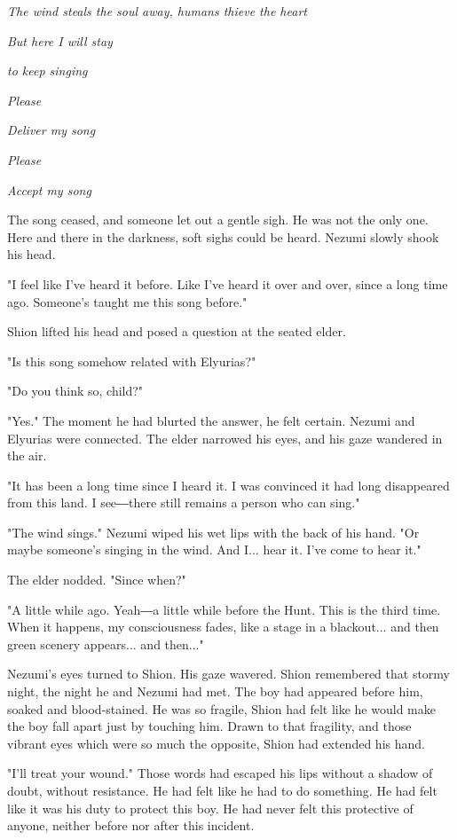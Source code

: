 \emph{The wind steals the soul away, humans thieve the heart}

\emph{But here I will stay}

\emph{to keep singing}

\emph{Please}

\emph{Deliver my song}

\emph{Please}

\emph{Accept my song}

The song ceased, and someone let out a gentle sigh. He was not the only
one. Here and there in the darkness, soft sighs could be heard. Nezumi
slowly shook his head.

"I feel like I've heard it before. Like I've heard it over and over,
since a long time ago. Someone's taught me this song before."

Shion lifted his head and posed a question at the seated elder.

"Is this song somehow related with Elyurias?"

"Do you think so, child?"

"Yes." The moment he had blurted the answer, he felt certain. Nezumi and
Elyurias were connected. The elder narrowed his eyes, and his gaze
wandered in the air.

"It has been a long time since I heard it. I was convinced it had long
disappeared from this land. I see―there still remains a person who can
sing."

"The wind sings." Nezumi wiped his wet lips with the back of his hand.
"Or maybe someone's singing in the wind. And I... hear it. I've come to
hear it."

The elder nodded. "Since when?"

"A little while ago. Yeah―a little while before the Hunt. This is the
third time. When it happens, my consciousness fades, like a stage in a
blackout... and then green scenery appears... and then..."

Nezumi's eyes turned to Shion. His gaze wavered. Shion remembered that
stormy night, the night he and Nezumi had met. The boy had appeared
before him, soaked and blood-stained. He was so fragile, Shion had felt
like he would make the boy fall apart just by touching him. Drawn to
that fragility, and those vibrant eyes which were so much the opposite,
Shion had extended his hand.

"I'll treat your wound." Those words had escaped his lips without a
shadow of doubt, without resistance. He had felt like he had to do
something. He had felt like it was his duty to protect this boy. He had
never felt this protective of anyone, neither before nor after this
incident.

